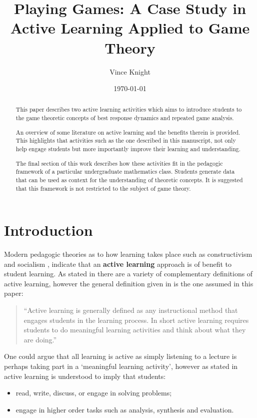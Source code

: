 \documentclass{article}
\title{Playing Games: A Case Study in Active Learning Applied to Game Theory}
\author{Vince Knight}
\date{\today}
\begin{document}
\maketitle

\begin{abstract}
    This paper describes two active learning activities which aims to introduce
    students to the game theoretic concepts of best response dynamics and
    repeated game analysis.

    An overview of some literature on active learning and the benefits therein
    is provided. This highlights that activities such as the one described
    in this manuscript, not only help engage students but more importantly
    improve their learning and understanding.

    The final section of this work describes how these activities fit in the
    pedagogic framework of a particular undergraduate mathematics class.
    Students generate data that can be used as context for the understanding of
    theoretic concepts. It is suggested that this framework is not restricted to
    the subject of game theory.
\end{abstract}

\section{Introduction}\label{sec:introduction}

Modern pedagogic theories as to how learning takes place such as constructivism
and socialism \cite{Illeris2009, Jordan2008a}, indicate that an \textbf{active
learning} approach is of benefit to student learning.  As stated in
\cite{Prince2004} there are a variety of complementary definitions of active
learning, however the general definition given in \cite{Prince2004} is the one
assumed in this paper:

\begin{quote}
``Active learning is generally defined as any instructional method that engages
students in the learning process. In short active learning requires students to
do meaningful learning activities and think about what they are doing.''
\end{quote}

One could argue that all learning is active as simply listening to a lecture is
perhaps taking part in a `meaningful learning activity', however as stated in
\cite{Bonwell1991} active learning is understood to imply that students:

\begin{itemize}
    \item read, write, discuss, or engage in solving problems;
    \item engage in higher order tasks such as analysis, synthesis and
        evaluation.
\end{itemize}
\end{document}
